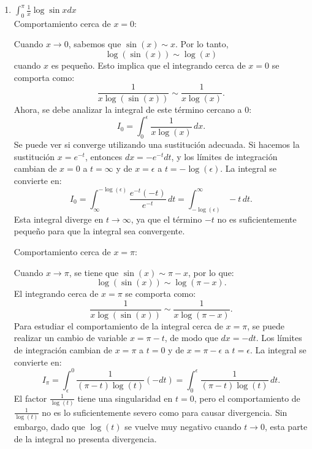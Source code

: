 \documentclass{article}
\begin{document}
\begin{enumerate}
\begin{enumerate}
Se puede concluir que la integral converge si \( m > -1 \), independientemente del valor de \( n \), ya que el decaimiento de \( e^{-x} \) en el límite \( x \to \infty \) asegura la convergencia.

Además, el comportamiento en \( x \to 0 \) también garantiza que la integral sea convergente bajo la misma condición \( m > -1 \).

Por lo tanto, la integral converge para \( m > -1 \) y cualquier valor de \( n \).

		\item $ \int_{0}^{\pi} \frac{1}{x} \log \sin x dx  $
\[\]        
Comportamiento cerca de \( x = 0 \):

Cuando \( x \to 0 \), sabemos que \( \sin(x) \sim x \). Por lo tanto,
\[
\log(\sin(x)) \sim \log(x)
\]
cuando \( x \) es pequeño. Esto implica que el integrando cerca de \( x = 0 \) se comporta como:
\[
\frac{1}{x \log(\sin(x))} \sim \frac{1}{x \log(x)}.
\]
Ahora, se debe analizar la integral de este término cercano a 0:
\[
I_0 = \int_0^\epsilon \frac{1}{x \log(x)} \, dx.
\]
Se puede ver si converge utilizando una sustitución adecuada. Si hacemos la sustitución \( x = e^{-t} \), entonces \( dx = -e^{-t} dt \), y los límites de integración cambian de \( x = 0 \) a \( t = \infty \) y de \( x = \epsilon \) a \( t = -\log(\epsilon) \). La integral se convierte en:
\[
I_0 = \int_{\infty}^{-\log(\epsilon)} \frac{e^{-t} (-t)}{e^{-t}} \, dt = \int_{-\log(\epsilon)}^{\infty} -t \, dt.
\]
Esta integral diverge en \( t \to \infty \), ya que el término \( -t \) no es suficientemente pequeño para que la integral sea convergente.

Comportamiento cerca de \( x = \pi \):

Cuando \( x \to \pi \), se tiene que \( \sin(x) \sim \pi - x \), por lo que:
\[
\log(\sin(x)) \sim \log(\pi - x).
\]
El integrando cerca de \( x = \pi \) se comporta como:
\[
\frac{1}{x \log(\sin(x))} \sim \frac{1}{x \log(\pi - x)}.
\]
Para estudiar el comportamiento de la integral cerca de \( x = \pi \), se puede realizar un cambio de variable \( x = \pi - t \), de modo que \( dx = -dt \). Los límites de integración cambian de \( x = \pi \) a \( t = 0 \) y de \( x = \pi - \epsilon \) a \( t = \epsilon \). La integral se convierte en:
\[
I_\pi = \int_{\epsilon}^0 \frac{1}{(\pi - t) \log(t)} (-dt) = \int_0^\epsilon \frac{1}{(\pi - t) \log(t)} \, dt.
\]
El factor \( \frac{1}{\log(t)} \) tiene una singularidad en \( t = 0 \), pero el comportamiento de \( \frac{1}{\log(t)} \) no es lo suficientemente severo como para causar divergencia. Sin embargo, dado que \( \log(t) \) se vuelve muy negativo cuando \( t \to 0 \), esta parte de la integral no presenta divergencia.


\end{enumerate}
\end{enumerate}
\end{document}
